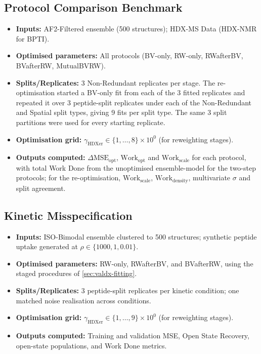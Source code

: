 \subsection{Protocol Comparison Benchmark}
\label{app:valdx-case-protocols}
\begin{itemize}
    \item \textbf{Inputs:} AF2-Filtered ensemble (500 structures); HDX-MS Data (HDX-NMR for BPTI).
    \item \textbf{Optimised parameters:} All protocols (BV-only, RW-only, RWafterBV, BVafterRW, MutualBVRW).
    \item \textbf{Splits/Replicates:} 3 Non-Redundant replicates per stage. The re-optimisation started a BV-only fit from each of the 3 fitted replicates and repeated it over 3 peptide-split replicates under each of the Non-Redundant and Spatial split types, giving 9 fits per split type. The same 3 split partitions were used for every starting replicate.
    \item \textbf{Optimisation grid:} $\gamma_\text{HDXer} \in \{1, \dots, 8\} \times 10^{0}$ (for reweighting stages).
    \item \textbf{Outputs computed:} $\Delta\text{MSE}_\text{opt}$, $\text{Work}_\text{opt}$ and $\text{Work}_\text{scale}$ for each protocol, with total Work Done from the unoptimised ensemble-model for the two-step protocols; for the re-optimisation, $\text{Work}_\text{scale}$, $\text{Work}_\text{density}$, multivariate $\sigma$ and split agreement.
\end{itemize}

\subsection{Kinetic Misspecification}
\label{app:valdx-case-kinetic}
\begin{itemize}
    \item \textbf{Inputs:} ISO-Bimodal ensemble clustered to 500 structures; synthetic peptide uptake generated at $\rho \in \{1000,1,0.01\}$.
    \item \textbf{Optimised parameters:} RW-only, RWafterBV, and BVafterRW, using the staged procedures of \cref{sec:valdx-fitting}.
    \item \textbf{Splits/Replicates:} 3 peptide-split replicates per kinetic condition; one matched noise realisation across conditions.
    \item \textbf{Optimisation grid:} $\gamma_\text{HDXer} \in \{1, \dots, 9\} \times 10^{0}$ (for reweighting stages).
    \item \textbf{Outputs computed:} Training and validation MSE, Open State Recovery, open-state populations, and Work Done metrics.
\end{itemize}

